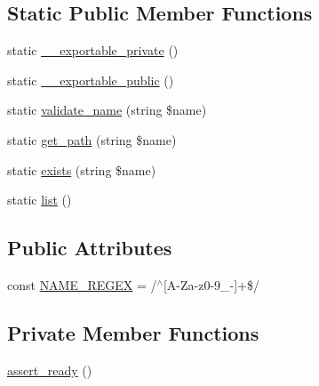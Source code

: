 \subsection*{Static Public Member Functions}
\begin{DoxyCompactItemize}
\item 
static \hyperlink{classlibresignage_1_1common_1_1php_1_1queue_1_1Queue_a7fccfca8b5abebcefb31093d28def5ef}{\+\_\+\+\_\+exportable\+\_\+private} ()
\item 
static \hyperlink{classlibresignage_1_1common_1_1php_1_1queue_1_1Queue_a3b41d3823f06778ffa786d05e1d9faad}{\+\_\+\+\_\+exportable\+\_\+public} ()
\item 
static \hyperlink{classlibresignage_1_1common_1_1php_1_1queue_1_1Queue_a1fcaf25b7ce379589c73c8796d94dc45}{validate\+\_\+name} (string \$name)
\item 
static \hyperlink{classlibresignage_1_1common_1_1php_1_1queue_1_1Queue_adbee76308f559c7c68f36f6f16bb5bf7}{get\+\_\+path} (string \$name)
\item 
static \hyperlink{classlibresignage_1_1common_1_1php_1_1queue_1_1Queue_a75c2ca8bcc10f0aa4b3e4988708562e1}{exists} (string \$name)
\item 
static \hyperlink{classlibresignage_1_1common_1_1php_1_1queue_1_1Queue_a8514ef7ce47d8441f706f27fc3550135}{list} ()
\end{DoxyCompactItemize}
\subsection*{Public Attributes}
\begin{DoxyCompactItemize}
\item 
const \hyperlink{classlibresignage_1_1common_1_1php_1_1queue_1_1Queue_a1471d3590d0b779a62c56510b2d9c6af}{N\+A\+M\+E\+\_\+\+R\+E\+G\+EX} = \textquotesingle{}/$^\wedge$\mbox{[}A-\/Za-\/z0-\/9\+\_\+-\/\mbox{]}+\$/\textquotesingle{}
\end{DoxyCompactItemize}
\subsection*{Private Member Functions}
\begin{DoxyCompactItemize}
\item 
\hyperlink{classlibresignage_1_1common_1_1php_1_1queue_1_1Queue_a4a097c1a6f7c4267873f6a853c5849d1}{assert\+\_\+ready} ()
\end{DoxyCompactItemize}
